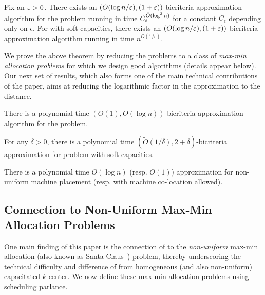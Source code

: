 \begin{theorem}\label{thm:1}
	Fix an $\varepsilon > 0$. There exists an $(O(\log n/\varepsilon), (1+\varepsilon))$-bicriteria approximation algorithm for the \mckc problem running in time $C_\varepsilon^{\tilde{O}(\log^3n)}$ for a constant $C_\epsilon$ depending only on $\epsilon$. For \mckc with soft capacities, there exists an $(O(\log n/\varepsilon), (1+\varepsilon))$-bicriteria approximation algorithm running in time $n^{O(1/\epsilon)}$.
\end{theorem}

We prove the above theorem by reducing the \mckc problems to a class of {\em max-min allocation problems} for which we design good algorithms (details appear below). Our next set of results, which also forms one of the main technical contributions of the paper, aims at reducing the logarithmic factor in the approximation to the distance. %
\begin{theorem}\label{thm:2}
	There is a polynomial time  $(O(1),O(\log n))$-bicriteria approximation algorithm for the \mckc problem.
\end{theorem}
\begin{theorem}\label{thm:2a}
	For any $\delta>0$, there is a polynomial time  $(\tilde{O}(1/\delta),2+\delta)$-bicriteria approximation for \mckc problem with soft capacities.
\end{theorem}
\begin{corollary}
There is a polynomial time $O(\log n)$ (resp. $O(1)$) approximation for non-uniform machine placement (resp. with machine co-location allowed).
\end{corollary}


\subsection{Connection to Non-Uniform Max-Min Allocation Problems}
One main finding of this paper is the connection of \mckc to the {\em non-uniform} max-min allocation (also known as Santa Claus~\cite{BansalS06}) problem, thereby
 underscoring the technical difficulty and difference of \mckc from  homogeneous (and also non-uniform) capacitated $k$-center. %
We now define these max-min allocation problems using  scheduling parlance.

